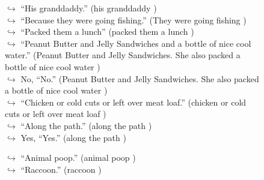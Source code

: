 \documentclass[11pt,a4paper, onecolumn]{article}
\begin{document}
\begin{figure}[t] \small \begin{tcolorbox}[boxsep=0pt,left=5pt,right=0pt,top=2pt,colback = yellow!5] \begin{dialogue}
 \small 
\colorbox{pink!25}{$\hookrightarrow$}
{ ``His granddaddy.'' (his granddaddy ) }
\\
\colorbox{pink!25}{$\hookrightarrow$}
{ ``Because they were going fishing.'' (They were going fishing ) }
\\
\colorbox{pink!25}{$\hookrightarrow$}
{ ``Packed them a lunch'' (packed them a lunch ) }
\\
\colorbox{pink!25}{$\hookrightarrow$}
{ ``Peanut Butter and Jelly Sandwiches and a bottle of nice cool water.'' (Peanut Butter and Jelly Sandwiches. She also packed a bottle of nice cool water ) }
\\
\colorbox{pink!25}{$\hookrightarrow$}
\colorbox{red!25}{No,}
{ ``No.'' (Peanut Butter and Jelly Sandwiches. She also packed a bottle of nice cool water ) }
\\
\colorbox{pink!25}{$\hookrightarrow$}
{ ``Chicken or cold cuts or left over meat loaf.'' (chicken or cold cuts or left over meat loaf ) }
\\
\colorbox{pink!25}{$\hookrightarrow$}
{ ``Along the path.'' (along the path ) }
\\
\colorbox{pink!25}{$\hookrightarrow$}
\colorbox{red!25}{Yes,}
{ ``Yes.'' (along the path ) }
 \end{dialogue}\end{tcolorbox}\end{figure}\begin{figure}[t] \small \begin{tcolorbox}[boxsep=0pt,left=5pt,right=0pt,top=2pt,colback = yellow!5] \begin{dialogue}
 \small 
\colorbox{pink!25}{$\hookrightarrow$}
{ ``Animal poop.'' (animal poop ) }
\\
\colorbox{pink!25}{$\hookrightarrow$}
{ ``Raccoon.'' (raccoon ) }
\\
 \end{dialogue}\end{tcolorbox}\end{figure}
\end{document}
